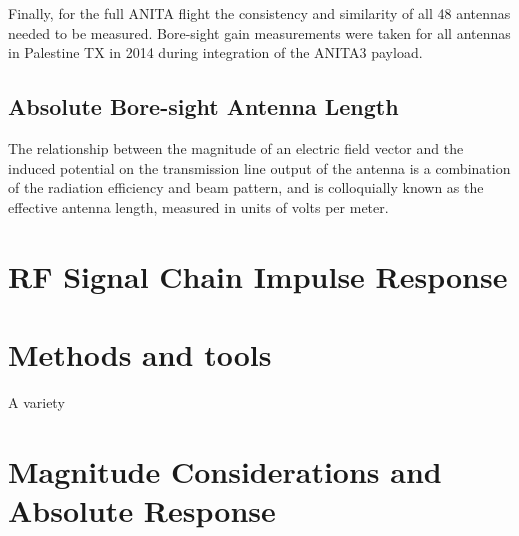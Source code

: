 	Finally, for the full ANITA flight the consistency and similarity of all 48 antennas needed to be measured.  Bore-sight gain measurements were taken for all antennas in Palestine TX in 2014 during integration of the ANITA3 payload.
	
	\subsection{Absolute Bore-sight Antenna Length}
		
		The relationship between the magnitude of an electric field vector and the induced potential on the transmission line output of the antenna is a combination of the radiation efficiency and beam pattern, and is colloquially known as the effective antenna length, measured in units of volts per meter.  
	
	

\section{RF Signal Chain Impulse Response}


\section{Methods and tools}
	
	A variety 

\section{Magnitude Considerations and Absolute Response}
	
